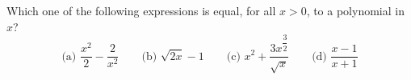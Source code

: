 Which one of the following expressions is equal, for all $x>0$, to a polynomial in $x$?
\[
\text{(a) }\dfrac{x^2}{2}-\dfrac{2}{x^2}\qquad\text{(b) }\sqrt{2x}-1\qquad\text{(c) }x^2+\dfrac{3x^{\dfrac{3}{2}}}{\sqrt{x}}\qquad\text{(d) }\dfrac{x-1}{x+1}
\]
